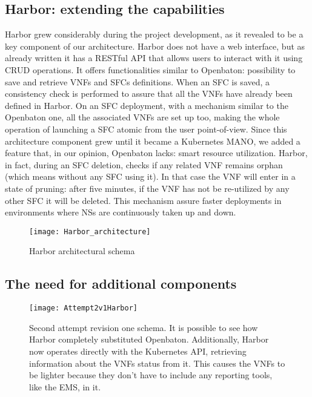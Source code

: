 \subsection{Harbor: extending the capabilities}
\label{chap:archimpl:sec:secondattempt:sub:harbor}
Harbor grew considerably during the project development, as it revealed to be a
key component of our architecture. Harbor does not have a web interface, but as
already written it has a RESTful API that allows users to interact with it using
CRUD operations. It offers functionalities similar to Openbaton: possibility to
save and retrieve VNFs and SFCs definitions. When an SFC is saved, a consistency
check is performed to assure that all the VNFs have already been defined in
Harbor. On an SFC deployment, with a mechanism similar to the Openbaton one, all
the associated VNFs are set up too, making the whole operation of launching a
SFC atomic from the user point-of-view. Since this architecture component grew
until it became a Kubernetes MANO, we added a feature that, in our opinion,
Openbaton lacks: smart resource utilization. Harbor, in fact, during an SFC
deletion, checks if any related VNF remains orphan (which means without any SFC
using it). In that case the VNF will enter in a state of pruning: after five
minutes, if the VNF has not be re-utilized by any other SFC it will be deleted.
This mechanism assure faster deployments in environments where NSs are
continuously taken up and down.

\begin{figure}[t]
 \centering
 \texttt{[image: Harbor\_architecture]}
 \caption[Harbor architectural schema]{Harbor architectural schema}
 \label{chap:archimpl:sec:secondattempt:img:harborarchitecture}
\end{figure}

\subsection{The need for additional components}

\begin{figure}[t]
  \centering
  \texttt{[image: Attempt2v1Harbor]}
  \caption[Second attempt revision one schema]{Second attempt revision one
    schema. It is possible to see how Harbor completely substituted Openbaton.
    Additionally, Harbor now operates directly with the Kubernetes API,
    retrieving information about the VNFs status from it. This causes the VNFs
    to be lighter because they don't have to include any reporting tools, like
    the EMS, in it.}
  \label{chap:archimple:sec:secondattempt:img:attempt2v1harbor}
\end{figure}


